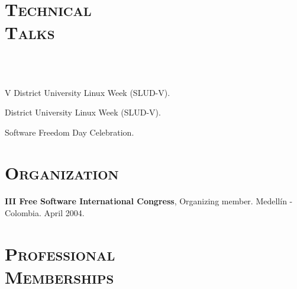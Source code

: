 \begin{resume}
\section{\textsc{Technical \\ Talks}}

\begin{formatb}
  \\
  \\
   \body
\end{formatb}

\begin{position}
V District University Linux Week (SLUD-V).
\end{position}

\begin{position}
District  University Linux Week (SLUD-V).
\end{position}

\begin{position}
Software Freedom Day Celebration.
\end{position}


\section{\textsc{Organization}}
\employer{\textbf{}}
\dates{}
\textbf{III Free Software International Congress}, Organizing member. Medellín - Colombia. April 2004.
\newline     
\newline
\newline
\newline     
\newline
\newline     


\section{\textsc{Professional\\ Memberships}}


\end{resume}
